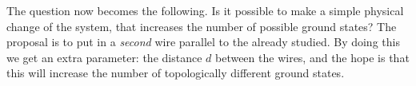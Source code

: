The question now becomes the following. Is it possible to make a simple physical change of the system, that increases the number of possible ground states? The proposal is to put in a \textit{second} wire parallel to the already studied. By doing this we get an extra parameter: the distance $d$ between the wires, and the hope is that this will increase the number of topologically different ground states.   







